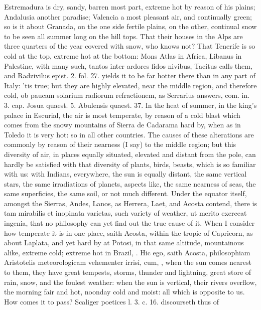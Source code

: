 {Estremadura is dry, sandy, barren most part, extreme hot by reason of
his plains; Andalusia another paradise; Valencia a most pleasant air,
and continually green; so is it about Granada, on the one side
fertile plains, on the other, continual snow to be seen all summer long
on the hill tops. That their houses in the Alps are three quarters of
the year covered with snow, who knows not? That Tenerife is so cold at
the top, extreme hot at the bottom: Mons Atlas in Africa, Libanus in
Palestine, with many such, tantos inter ardores fidos nivibus,
Tacitus calls them, and Radzivilus epist. 2. fol. 27. yields it
to be far hotter there than in any part of Italy: 'tis true; but they
are highly elevated, near the middle region, and therefore cold, ob
paucam solarium radiorum refractionem, as Serrarius answers, com. in.
3. cap. Josua quaest. 5. Abulensis quaest. 37. In the heat of summer,
in the king's palace in Escurial, the air is most temperate, by reason
of a cold blast which comes from the snowy mountains of Sierra de
Cadarama hard by, when as in Toledo it is very hot: so in all other
countries. The causes of these alterations are commonly by reason of
their nearness (I say) to the middle region; but this diversity of air,
in places equally situated, elevated and distant from the pole, can
hardly be satisfied with that diversity of plants, birds, beasts, which
is so familiar with us: with Indians, everywhere, the sun is equally
distant, the same vertical stars, the same irradiations of planets,
aspects like, the same nearness of seas, the same superficies, the same
soil, or not much different. Under the equator itself, amongst the
Sierras, Andes, Lanos, as Herrera, Laet, and Acosta contend,
there is tam mirabilis et inopinata varietas, such variety of weather,
ut merito exerceat ingenia, that no philosophy can yet find out the
true cause of it. When I consider how temperate it is in one place,
saith Acosta, within the tropic of Capricorn, as about Laplata,
and yet hard by at Potosi, in that same altitude, mountainous alike,
extreme cold; extreme hot in Brazil, \etc{}. Hic ego, saith Acosta,
philosophiam Aristotelis meteorologicam vehementer irrisi, cum, \etc{},
when the sun comes nearest to them, they have great tempests, storms,
thunder and lightning, great store of rain, snow, and the foulest
weather: when the sun is vertical, their rivers overflow, the morning
fair and hot, noonday cold and moist: all which is opposite to us. How
comes it to pass? Scaliger poetices l. 3. c. 16. discourseth thus of
}

